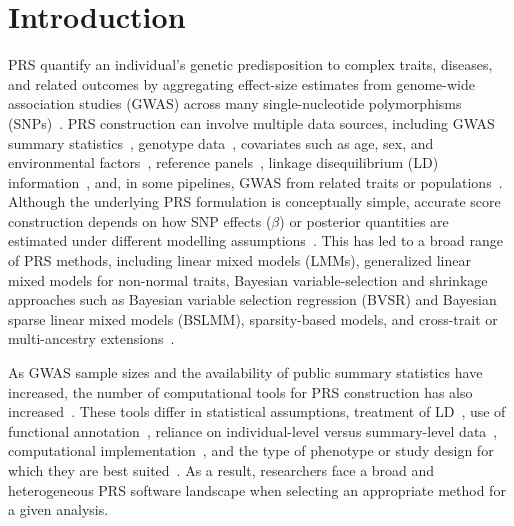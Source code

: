 \documentclass[pdflatex,sn-basic]{sn-jnl}
\begin{document}
 


\maketitle

 
\newpage
\section*{Introduction}
PRS quantify an individual’s genetic predisposition to complex traits, diseases, and related outcomes by aggregating effect-size estimates from genome-wide association studies (GWAS) across many single-nucleotide polymorphisms (SNPs)~\cite{Choi2020,Lewis2020,RN8133,Nakase2024}. PRS construction can involve multiple data sources, including GWAS summary statistics~\cite{Nakase2024}, genotype data~\cite{Hui2023}, covariates such as age, sex, and environmental factors~\cite{Hui2023}, reference panels~\cite{Loh2023}, linkage disequilibrium (LD) information~\cite{Vilhjalmsson2015}, and, in some pipelines, GWAS from related traits or populations~\cite{Zhuang2024}. Although the underlying PRS formulation is conceptually simple, accurate score construction depends on how SNP effects ($\beta$) or posterior quantities are estimated under different modelling assumptions~\cite{ZHU20201557}. This has led to a broad range of PRS methods, including linear mixed models (LMMs), generalized linear mixed models for non-normal traits, Bayesian variable-selection and shrinkage approaches such as Bayesian variable selection regression (BVSR) and Bayesian sparse linear mixed models (BSLMM), sparsity-based models, and cross-trait or multi-ancestry extensions~\cite{Loh2023,ZHU20201557}.

As GWAS sample sizes and the availability of public summary statistics have increased, the number of computational tools for PRS construction has also increased~\cite{Choi2020,Lewis2020}. These tools differ in statistical assumptions, treatment of LD~\cite{Vilhjalmsson2015}, use of functional annotation~\cite{Zhuang2024}, reliance on individual-level versus summary-level data~\cite{Hui2023}, computational implementation~\cite{ZHU20201557}, and the type of phenotype or study design for which they are best suited~\cite{Ma2021,Zhang_2021}. As a result, researchers face a broad and heterogeneous PRS software landscape when selecting an appropriate method for a given analysis.
\end{document}
